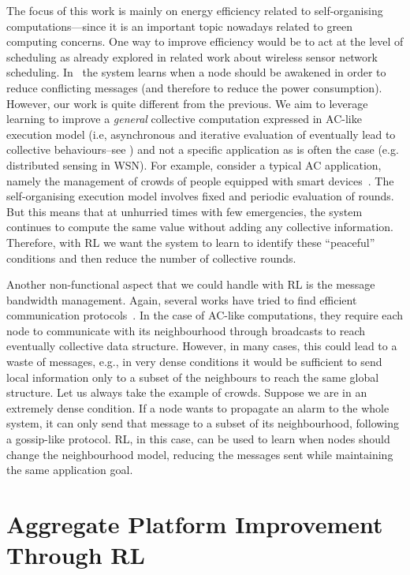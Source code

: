 {The focus of this work is mainly on energy efficiency 
 related to self-organising computations---since it is an important topic nowadays related to green computing concerns.
One way to improve efficiency would be to act at the level of scheduling
 as already explored in related work about wireless sensor network scheduling.
 In~\cite{DBLP:journals/automatica/IwakiWWSJ21,DBLP:journals/ijcnds/MihaylovBTN12} the system learns 
 when a node should be awakened in order to reduce conflicting messages 
 (and therefore to reduce the power consumption). 
However, our work is quite different from the previous. 
 We aim to leverage learning to improve a \emph{general} collective computation 
 expressed in \ac{AC}-like execution model 
 (i.e, asynchronous and iterative evaluation of  eventually lead to collective behaviours--see )
 and not a specific application as is often the case (e.g. distributed sensing in WSN).
For example, consider a typical AC application, 
 namely the management of crowds of people equipped with smart devices~\cite{DBLP:journals/computer/BealPV15}. 
 The self-organising execution model involves fixed and periodic evaluation of rounds. 
 But this means that at unhurried times with few emergencies, 
 the system continues to compute the same value without adding any collective information. 
Therefore, with \ac{RL} we want the system to learn 
 to identify these ``peaceful'' conditions 
 and then reduce the number of collective rounds.

Another non-functional aspect that we could handle with 
 \ac{RL} is the message bandwidth management. 
Again, several works have tried to find efficient communication protocols~\cite{DBLP:conf/nips/ZhangZL19, su2019cooperative}.
In the case of AC-like computations, they require each node to communicate 
 with its neighbourhood through broadcasts to reach eventually 
 collective data structure. 
 However, in many cases, this could lead to a waste of messages, 
 e.g., in very dense conditions it would be sufficient to send local information 
 only to a subset of the neighbours to reach the same global structure.
Let us always take the example of crowds. 
Suppose we are in an extremely dense condition. 
If a node wants to propagate an alarm to the whole system, 
 it can only send that message to a subset of its neighbourhood, 
 following a gossip-like protocol. 
\ac{RL}, in this case, can be used to learn when nodes should change 
 the neighbourhood model, reducing the messages sent 
 while maintaining the same application goal.
}
\section{Aggregate Platform Improvement Through \acl{RL}}\label{sec:contribution}


